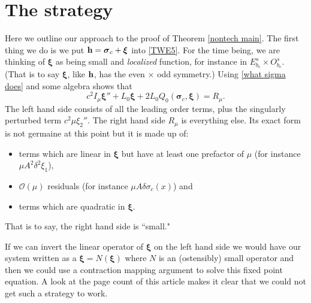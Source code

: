 \documentclass[12pt]{amsart}
\numberwithin{equation}{section}
\newcommand{\be}{\begin{equation}}
\newcommand{\ee}{\end{equation}}
\newcommand{\hb}{{\bf{h}}}
\renewcommand{\O}{{\mathcal{O}}}
\newcommand{\sigmab}{{\boldsymbol \sigma}}
\newcommand{\xib}{{\boldsymbol \xi}}
\begin{document}


\section{The strategy}\label{strategy}
Here we outline our approach to the proof of Theorem \ref{nontech main}.
The first thing we do is we put 
$
\hb = \sigmab_c + \xib
$
into \eqref{TWE5}. 
For the time being, we are thinking of $\xib$ as being small and {\it localized} function, for instance in $E^s_{b_c} \times O^s_{b_c}$.
(That is to say $\xib$, like $\hb$, has the even $\times$ odd symmetry.)
Using \eqref{what sigma does} and 
some algebra shows that
\be\label{first pass}
c^2 I_\mu \xib'' + L_0 \xib + 2L_0 Q_0(\sigmab_c,\xib) = R_\mu.
\ee
The left hand side consists of all the leading order terms, plus the singularly perturbed term $c^2 \mu \xi_2''$.
The right hand side $R_\mu$ is everything else.
Its exact form is not 
germaine at this point but it is made up of:
\begin{itemize}
\item terms which are linear in $\xib$ but have at least one prefactor of $\mu$
(for instance $\mu A^2\delta^2 \xi_1$),  \item $\O(\mu)$ residuals
(for instance $\mu A\delta \sigma_c(x)$) and 
\item terms which are quadratic in $\xib$.
\end{itemize}
 That is to say, the right hand side is ``small." 
 
 If we can invert the linear operator of $\xib$ on the left hand side we would
have our system written as a $\xib = N(\xib)$ where $N$ is an (ostensibly) small operator and then we could use a contraction mapping argument to solve this fixed point equation. A look at the page count of this article makes it clear that we could not get such a  strategy to work.
\end{document}
